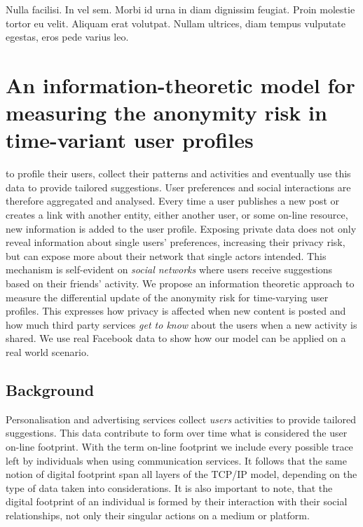 \begin{savequote}[75mm]
Nulla facilisi. In vel sem. Morbi id urna in diam dignissim feugiat. Proin molestie tortor eu velit. Aliquam erat volutpat. Nullam ultrices, diam tempus vulputate egestas, eros pede varius leo.
\end{savequote}

\chapter{An information-theoretic model for measuring the anonymity risk in time-variant user profiles}

 to profile their users, collect their patterns and activities and eventually use this data to provide tailored suggestions. User preferences and social interactions are therefore aggregated and analysed. Every time a user publishes a new post or creates a link with another entity, either another user, or some on-line resource, new information is added to the user profile. Exposing private data does not only reveal information about single users' preferences, increasing their privacy risk, but can expose more about their network that single actors intended. This mechanism is self-evident on \emph{social networks} where users receive suggestions based on their friends' activity.
We propose an information theoretic approach to measure the differential update of the anonymity risk for time-varying user profiles. This expresses how privacy is affected when new content is posted and how much third party services \emph{get to know} about the users when a new activity is shared. We use real Facebook data to show how our model can be applied on a real world scenario.

\section{Background}

Personalisation and advertising services collect \emph{users} activities to provide tailored suggestions. This data contribute to form over time what is considered the user on-line footprint. With the term on-line footprint we include every possible trace left by individuals when using communication services. It follows that the same notion of digital footprint span all layers of the TCP/IP model, depending on the type of data taken into considerations. It is also important to note, that the digital footprint of an individual is formed by their interaction with their social relationships, not only their singular actions on a medium or platform.

